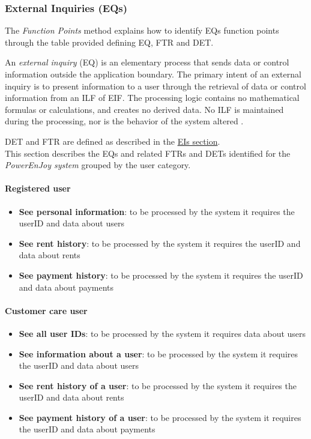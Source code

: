 \subsubsection{External Inquiries (EQs)}
The \emph{Function Points} method explains how to identify EQs function points through the table provided defining EQ, FTR and DET.

An \textit{external inquiry} (EQ) is an elementary process that sends data or control information outside the application boundary. The primary intent of an external inquiry is to present information to a user through the retrieval of data or control information from an ILF of EIF. The processing logic contains no mathematical formulas or calculations, and creates no derived data. No ILF is maintained during the processing, nor is the behavior of the system
altered \cite{FP}.

DET and FTR are defined as described in the \hyperref[sec:EIs]{EIs section}.\\

This section describes the EQs and related FTRs and DETs identified for the \emph{PowerEnJoy system} grouped by the user category.

\paragraph{Registered user}
\begin{itemize}
	\item \textbf{See personal information}: to be processed by the system it requires the userID and data about users
	\item \textbf{See rent history}: to be processed by the system it requires the userID and data about rents
	\item \textbf{See payment history}: to be processed by the system it requires the userID and data about payments
\end{itemize}

\paragraph{Customer care user}
\begin{itemize}
	\item \textbf{See all user IDs}:  to be processed by the system it requires data about users
	\item \textbf{See information about a user}: to be processed by the system it requires the userID and data about users
	\item \textbf{See rent history of a user}: to be processed by the system it requires the userID and data about rents
	\item \textbf{See payment history of a user}: to be processed by the system it requires the userID and data about payments
\end{itemize}

